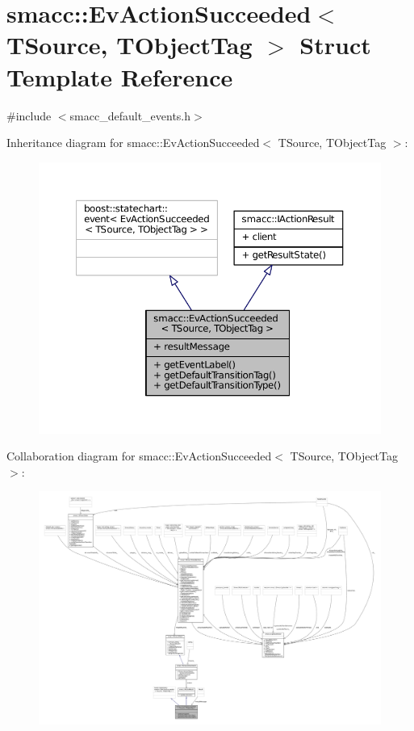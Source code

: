 \hypertarget{structsmacc_1_1EvActionSucceeded}{}\section{smacc\+:\+:Ev\+Action\+Succeeded$<$ T\+Source, T\+Object\+Tag $>$ Struct Template Reference}
\label{structsmacc_1_1EvActionSucceeded}


{\ttfamily \#include $<$smacc\+\_\+default\+\_\+events.\+h$>$}



Inheritance diagram for smacc\+:\+:Ev\+Action\+Succeeded$<$ T\+Source, T\+Object\+Tag $>$\+:
\nopagebreak
\begin{figure}[H]
\begin{center}
\leavevmode
\includegraphics[width=350pt]{structsmacc_1_1EvActionSucceeded__inherit__graph}
\end{center}
\end{figure}


Collaboration diagram for smacc\+:\+:Ev\+Action\+Succeeded$<$ T\+Source, T\+Object\+Tag $>$\+:
\nopagebreak
\begin{figure}[H]
\begin{center}
\leavevmode
\includegraphics[width=350pt]{structsmacc_1_1EvActionSucceeded__coll__graph}
\end{center}
\end{figure}
